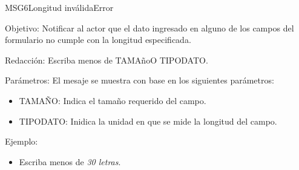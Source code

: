 \begin{mensaje}{MSG6}{Longitud inválida}{Error}
	\item [Objetivo:] Notificar al actor que el dato ingresado en alguno de los campos del formulario no cumple con la longitud especificada.
	\item[Redacción:] Escriba menos de TAMAñoO TIPODATO.
	\item[Parámetros:] El mesaje se muestra con base en los siguientes parámetros:
		\begin{itemize}
 			\item TAMAÑO: Indica el tamaño requerido del campo.
 			\item TIPODATO: Inidica la unidad en que se mide la longitud del campo.
		\end{itemize}
	\item[Ejemplo:] 
	\begin{itemize}
		\item Escriba menos de {\em 30 letras}.
	\end{itemize}
\end{mensaje}